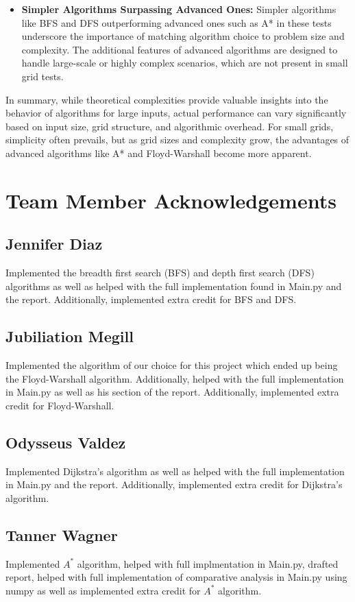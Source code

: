 \documentclass[12pt]{article}
\begin{document}
\begin{itemize}
    \item \textbf{Simpler Algorithms Surpassing Advanced Ones:} Simpler algorithms like BFS and DFS outperforming advanced ones such as A* in these tests underscore the importance of matching algorithm choice to problem size and complexity. The additional features of advanced algorithms are designed to handle large-scale or highly complex scenarios, which are not present in small grid tests.
\end{itemize}

\noindent In summary, while theoretical complexities provide valuable insights into the behavior of algorithms for large inputs, actual performance can vary significantly based on input size, grid structure, and algorithmic overhead. For small grids, simplicity often prevails, but as grid sizes and complexity grow, the advantages of advanced algorithms like A* and Floyd-Warshall become more apparent.
\newpage


\section{Team Member Acknowledgements}
\subsection{Jennifer Diaz}
Implemented the breadth first search (BFS) and depth first search (DFS) algorithms as well as helped with the full implementation found in Main.py and the report. Additionally, implemented extra credit for BFS and DFS.

\subsection{Jubiliation Megill}
Implemented the algorithm of our choice for this project which ended up being the Floyd-Warshall algorithm. Additionally, helped with the full implementation in Main.py as well as his section of the report. Additionally, implemented extra credit for Floyd-Warshall.

\subsection{Odysseus Valdez}
Implemented Dijkstra's algorithm as well as helped with the full implementation in Main.py and the report. Additionally, implemented extra credit for Dijkstra's algorithm.

\subsection{Tanner Wagner}
Implemented $A^*$ algorithm, helped with full implmentation in Main.py, drafted report, helped with full implementation of comparative analysis in Main.py using numpy as well as implemented extra credit for $A^*$ algorithm.
\newpage
\end{document}
